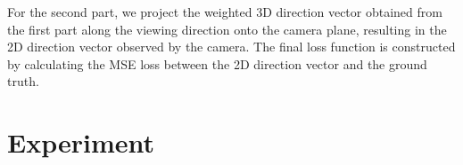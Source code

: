 \documentclass[12pt]{article}
\begin{document}
    For the second part, we project the weighted 3D direction vector obtained from the first part along the viewing direction onto the camera plane, resulting in the 2D direction vector observed by the camera. The final loss function is constructed by calculating the MSE loss between the 2D direction vector and the ground truth.
    
  \section{Experiment}
  
  

  \printbibliography
\end{document}
